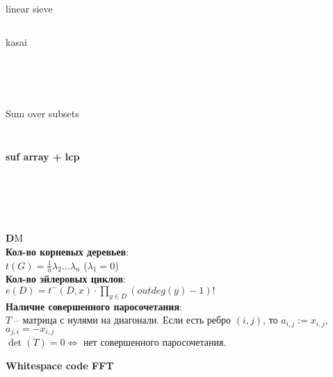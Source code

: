 \documentclass[a4paper,12pt]{article}
\begin{document}
\pagebreak
\inputminted[linenos, breaklines]{c++}{code/sk.cpp} \pagebreak
\inputminted[linenos, breaklines]{c++}{code/convex_hull_trick.cpp} \pagebreak
\inputminted[linenos, breaklines]{c++}{code/automaton2.cpp} \pagebreak
\inputminted[linenos, breaklines]{c++}{code/discrete_log.cpp} \pagebreak
\inputminted[linenos, breaklines]{c++}{code/euclid.cpp} 
linear sieve\\
\inputminted[linenos, breaklines]{c++}{code/sieve.cpp} 
kasai\\
\inputminted[linenos, breaklines]{c++}{code/kasai.cpp} \pagebreak
\inputminted[linenos, breaklines]{c++}{code/hungarian.cpp} \pagebreak
\inputminted[linenos, breaklines]{c++}{code/max_flow.cpp} \pagebreak
\inputminted[linenos, breaklines]{c++}{code/min_cost.cpp} \pagebreak
\inputminted[linenos, breaklines]{c++}{code/min_cyclic_shift.cpp}
Sum over subsets\\
\inputminted[linenos, breaklines]{c++}{code/sum_over_subsets.cpp}
 \pagebreak
\inputminted[linenos, breaklines]{c++}{code/strings.cpp} \pagebreak
\textbf{suf array + lcp}
\inputminted[linenos, breaklines]{c++}{code/suffmas-e-maxx.cpp} \pagebreak

\inputminted[linenos, breaklines]{c++}{code/prime_roots.cpp} \pagebreak

\inputminted[linenos, breaklines]{c++}{code/fft.cpp}
\inputminted[linenos, breaklines]{c++}{code/fft_and_ds.cpp}
\pagebreak
\inputminted[linenos,breaklines]{c++}{code/min_circulation.cpp}\pagebreak
\inputminted[linenos, breaklines]{c++}{code/min_mean_cycle.cpp}
\pagebreak
{\textbf DM}\\

{\bf Кол-во корневых деревьев}:\\
$t(G)=\frac 1 n \lambda_2 \ldots \lambda_n$ ($\lambda_1=0$)\\

{\bf Кол-во эйлеровых циклов}:\\
$e(D)=t^-(D,x) \cdot \prod\limits_{y\in D} (outdeg(y)-1)!$\\

{\bf Наличие совершенного паросочетания}:\\
$T$ -- матрица с нулями на диагонали. Если есть ребро $(i, j)$, то $a_{i,j}:=x_{i,j}$, $a_{j,i}=-x_{i,j}$\\
$\det(T)=0 \Leftrightarrow$ нет совершенного паросочетания.
\pagebreak

{\bf \Large Whitespace code FFT} \pagebreak
\end{document}
